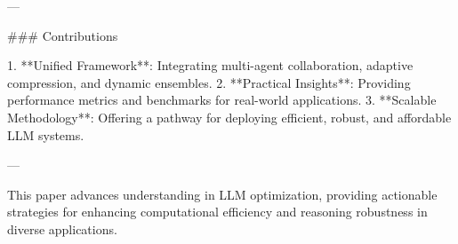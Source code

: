 ---

### Contributions

1. **Unified Framework**: Integrating multi-agent collaboration, adaptive compression, and dynamic ensembles.
2. **Practical Insights**: Providing performance metrics and benchmarks for real-world applications.
3. **Scalable Methodology**: Offering a pathway for deploying efficient, robust, and affordable LLM systems.

---

This paper advances understanding in LLM optimization, providing actionable strategies for enhancing computational efficiency and reasoning robustness in diverse applications.